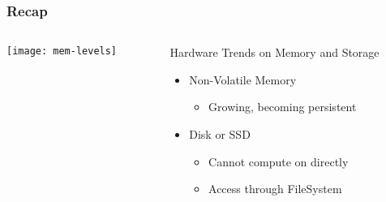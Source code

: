 %
%
\begin{frame}[plain]
	\frametitle{Recap}
	
	
	
	\begin{columns}
		
		\begin{column}{.6\textwidth}
			
			\texttt{[image: mem-levels]}
			
		\end{column}
		
		\begin{column}{.4\textwidth}
			
			
			Hardware Trends on Memory and Storage
			\begin{itemize}
				\item  Non-Volatile Memory
				\begin{itemize}
					\item Growing, becoming persistent
				\end{itemize}
			
				\item Disk or SSD
				\begin{itemize}
					\item Cannot compute on directly
                    \item Access through FileSystem
				\end{itemize}
			\end{itemize}	
			
		\end{column}
		
		
	\end{columns}
	
	
\end{frame}

